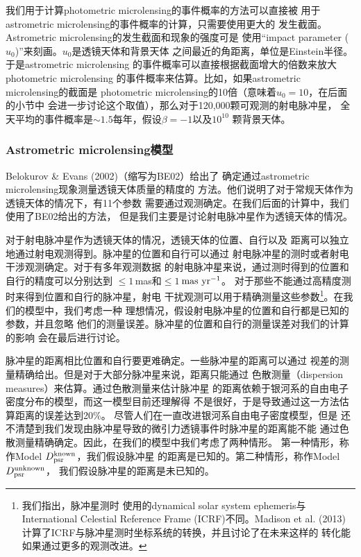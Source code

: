 我们用于计算photometric microlensing的事件概率的方法可以直接被
用于astrometric microlensing的事件概率的计算，只需要使用更大的
发生截面。Astrometric microlensing的发生截面和现象的强度可是
使用“impact parameter ($u_0$)”来刻画。$u_0$是透镜天体和背景天体
之间最近的角距离，单位是Einstein半径。于是astrometric microlensing
的事件概率可以直接根据截面增大的倍数来放大photometric microlensing
的事件概率来估算。比如，如果astrometric microlensing的截面是
photometric microlensing的10倍（意味着$u_0=10$，在后面的小节中
会进一步讨论这个取值），那么对于120,000颗可观测的射电脉冲星，
全天平均的事件概率是$\sim1.5$每年，假设$\beta=-1$以及$10^{10}$
颗背景天体。

\subsubsection{Astrometric microlensing模型}

Belokurov \& Evans (2002)\supercite{Bel}（缩写为BE02）给出了
确定通过astrometric microlensing现象测量透镜天体质量的精度的
方法。他们说明了对于常规天体作为透镜天体的情况下，有11个参数
需要通过观测确定。在我们后面的计算中，我们使用了BE02给出的方法，
但是我们主要是讨论射电脉冲星作为透镜天体的情况。

对于射电脉冲星作为透镜天体的情况，透镜天体的位置、自行以及
距离可以独立地通过射电观测得到。脉冲星的位置和自行可以通过
射电脉冲星的测时或者射电干涉观测确定。对于有多年观测数据
的射电脉冲星来说，通过测时得到的位置和自行的精度可以分别达到
$\leq 1$\,mas和$\leq 1$\,$\rm{mas\ yr^{-1}}$\supercite{verbiest}。
对于那些不能通过高精度测时来得到位置和自行的脉冲星，射电
干扰观测可以用于精确测量这些参数\footnote{我们指出，脉冲星测时
使用的dynamical solar system ephemeris与International Celestial 
Reference Frame (ICRF)不同。Madison et al. (2013)\supercite{Madison13}
计算了ICRF与脉冲星测时坐标系统的转换，并且讨论了在未来这样的
转化能如果通过更多的观测改进。}。在我们的模型中，我们考虑一种
理想情况，假设射电脉冲星的位置和自行都是已知的参数，并且忽略
他们的测量误差。脉冲星的位置和自行的测量误差对我们的计算的影响
会在最后进行讨论。

脉冲星的距离相比位置和自行要更难确定。一些脉冲星的距离可以通过
视差的测量精确给出。但是对于大部分脉冲星来说，距离只能通过
色散测量（dispersion measures）来估算。通过色散测量来估计脉冲星
的距离依赖于银河系的自由电子密度分布的模型，而这一模型目前还理解得
不是很好，于是导致通过这一方法估算距离的误差达到20\%\supercite{Taylor}。
尽管人们在一直改进银河系自由电子密度模型\supercite{cordes}，但是
还不清楚到我们发现由脉冲星导致的微引力透镜事件时脉冲星的距离能不能
通过色散测量精确确定。因此，在我们的模型中我们考虑了两种情形。
第一种情形，称作Model $D_{\rm{psr}}^{\rm{known}}$，我们假设脉冲星
的距离是已知的。第二种情形，称作Model $D_{\rm{psr}}^{\rm{unknown}}$，
我们假设脉冲星的距离是未已知的。

